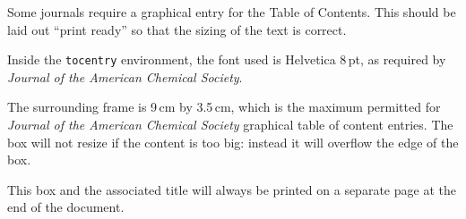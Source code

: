 

\begin{tocentry}

Some journals require a graphical entry for the Table of Contents.
This should be laid out ``print ready'' so that the sizing of the
text is correct.

Inside the \texttt{tocentry} environment, the font used is Helvetica
8\,pt, as required by \emph{Journal of the American Chemical
Society}.

The surrounding frame is 9\,cm by 3.5\,cm, which is the maximum
permitted for  \emph{Journal of the American Chemical Society}
graphical table of content entries. The box will not resize if the
content is too big: instead it will overflow the edge of the box.

This box and the associated title will always be printed on a
separate page at the end of the document.

\end{tocentry}

\begin{abstract}
  This is an example document for the \textsf{achemso} document
  class, intended for submissions to the American Chemical Society
  for publication. The class is based on the standard \LaTeXe\
  \textsf{report} file, and does not seek to reproduce the appearance
  of a published paper.

  This is an abstract for the \textsf{achemso} document class
  demonstration document.  An abstract is only allowed for certain
  manuscript types.  The selection of \texttt{journal} and
  \texttt{manuscript} will determine if an abstract is valid.  If
  not, the class will issue an appropriate error.
\end{abstract}

